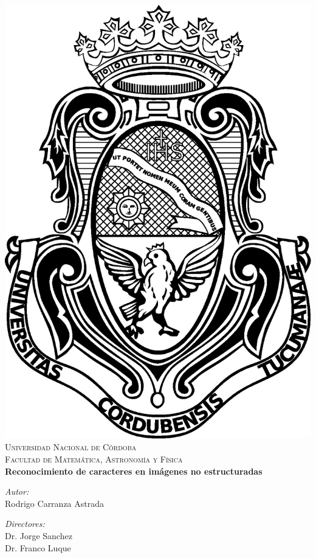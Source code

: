 \begin{titlepage}
	\begin{center}
		\includegraphics[scale=0.20]{img/escudoUNC.eps}\\[1cm]
		\textsc{\LARGE Universidad Nacional de C\'{o}rdoba}\\[0.5cm]
		\textsc{\Large Facultad de Matem\'{a}tica, Astronom\'{i}a y F\'{i}sica}\\[2.5cm]
	
			{\doublespacing \LARGE \bfseries
				Reconocimiento de caracteres en im\'{a}genes no estructuradas
			} \\[2.5cm]

			
		\begin{minipage}{0.4\textwidth}
			\begin{flushleft} \large
				\emph{Autor:}\\
					Rodrigo Carranza Astrada
			\end{flushleft}
			\end{minipage}
			\begin{minipage}{0.4\textwidth}
				\begin{flushright} \large
					\emph{Directores:} \\
						Dr. Jorge Sanchez\\
						Dr. Franco Luque
				\end{flushright}
		\end{minipage}\\[2cm]


\end{center}
\end{titlepage}
